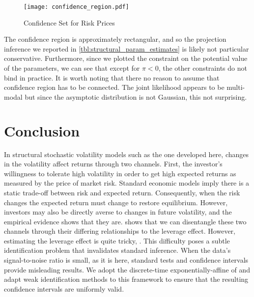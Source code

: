 \documentclass[11pt, letterpaper, twoside]{article}
\begin{document}
\begin{figure}[htb]

  \centering
  \caption{Confidence Set for Risk Prices}
  \label{fig:confidence_region}

  \texttt{[image: confidence\_region.pdf]}
\end{figure}

The confidence region is approximately rectangular, and so the projection inference we reported in \cref{tbl:structural_param_estimates} is likely not particular conservative. Furthermore, since we plotted the constraint on the potential value of the parameters, we can see that except for $\pi < 0$, the other constraints do not bind in practice. It is worth noting that there no reason to assume that confidence region has to be connected. The joint likelihood appears to be multi-modal but since the asymptotic distribution is not Gaussian, this not surprising.



\section{Conclusion}\label{sec:risk_conclusion}


In structural stochastic volatility models such as the one developed here, changes in the volatility affect returns through two channels. First, the investor's willingness to tolerate high volatility in order to get high expected returns as measured by the price of market risk. Standard economic models imply there is a static trade-off between risk and expected return. Consequently, when the risk changes the expected return must change to restore equilibrium. However, investors may also be directly averse to changes in future volatility, and the empirical evidence shows that they are. \Textcite{han2018leverage} shows that we can disentangle these two channels through their differing relationships to the leverage effect. However, estimating the leverage effect is quite tricky, \parencite{aitsahalia2013leverage}. This difficulty poses a subtle identification problem that invalidates standard inference. When the data's signal-to-noise ratio is small, as it is here, standard tests and confidence intervals provide misleading results. We adopt the discrete-time exponentially-affine of \textcite{han2018leverage} and adapt weak identification methods to this framework to ensure that the resulting confidence intervals are uniformly valid.
\end{document}

